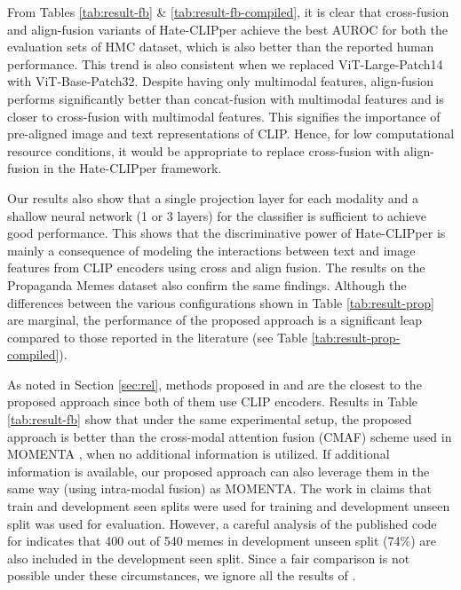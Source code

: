 \documentclass[11pt]{article}
\begin{document}
From Tables \ref{tab:result-fb} \& \ref{tab:result-fb-compiled}, it is clear that cross-fusion and align-fusion variants of Hate-CLIPper achieve the best AUROC for both the evaluation sets of HMC dataset, which is also better than the reported human performance. This trend is also consistent when we replaced ViT-Large-Patch14 with ViT-Base-Patch32. Despite having only  multimodal features, align-fusion performs significantly better than concat-fusion with  multimodal features and is closer to cross-fusion with   multimodal features. This signifies the importance of pre-aligned image and text representations of CLIP. Hence, for low computational resource conditions, it would be appropriate to replace cross-fusion with align-fusion in the Hate-CLIPper framework.

Our results also show that a single projection layer for each modality and a shallow neural network (1 or 3 layers) for the classifier is sufficient to achieve good performance. This shows that the discriminative power of Hate-CLIPper is mainly a consequence of modeling the interactions between text and image features from CLIP encoders using cross and align fusion. The results on the Propaganda Memes dataset also confirm the same findings. Although the differences between the various configurations shown in Table \ref{tab:result-prop} are marginal, the performance of the proposed approach is a significant leap compared to those reported in the literature (see Table \ref{tab:result-prop-compiled}).

As noted in Section \ref{sec:rel}, methods proposed in \cite{zia-etal-2021-racist} and \cite{pramanick2021momenta} are the closest to the proposed approach since both of them use CLIP encoders. Results in Table \ref{tab:result-fb} show that under the same experimental setup, the proposed approach is better than the cross-modal attention fusion (CMAF) scheme used in MOMENTA \cite{pramanick2021momenta}, when no additional information is utilized. If additional information is available, our proposed approach can also leverage them in the same way (using intra-modal fusion) as MOMENTA. The work in \cite{zia-etal-2021-racist} claims that train and development seen splits were used for training and development unseen split was used for evaluation. However, a careful analysis of the published code for \cite{zia-etal-2021-racist} indicates that 400 out of 540 memes in development unseen split (74\%) are also included in the development seen split. Since a fair comparison is not possible under these circumstances, we ignore all the results of \citet{zia-etal-2021-racist}.
\end{document}
